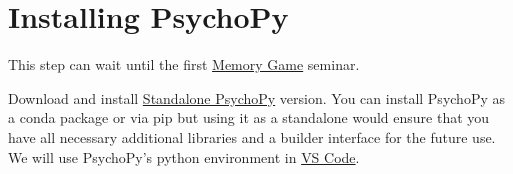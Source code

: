 \documentclass[
]{book}
\begin{document}
\hypertarget{install-psychopy}{%
\section*{Installing PsychoPy}\label{install-psychopy}}

This step can wait until the first \protect\hyperlink{memory-game-01}{Memory Game} seminar.

Download and install \href{https://www.psychopy.org/download.html}{Standalone PsychoPy} version. You can install PsychoPy as a conda package or via pip but using it as a standalone would ensure that you have all necessary additional libraries and a builder interface for the future use. We will use PsychoPy's python environment in \protect\hyperlink{install-vs-code}{VS Code}.
\end{document}
